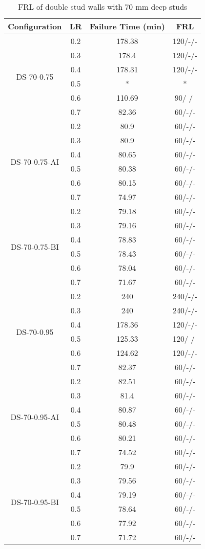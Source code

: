 \begin{table}[!htbp]
	\centering
	\caption{FRL of double stud walls with 70 mm deep studs}
	  \begin{tabular}{cccc}
	  \toprule
	  Configuration & LR    & Failure Time (min) & FRL \\
	  \midrule
	  \multirow{6}[2]{*}{DS-70-0.75} & 0.2   & 178.38 & 120/-/- \\
			& 0.3   & 178.4 & 120/-/- \\
			& 0.4   & 178.31 & 120/-/- \\
			& 0.5   & *     & * \\
			& 0.6   & 110.69 & 90/-/- \\
			& 0.7   & 82.36 & 60/-/- \\
	  \midrule
	  \multirow{6}[2]{*}{DS-70-0.75-AI} & 0.2   & 80.9  & 60/-/- \\
			& 0.3   & 80.9  & 60/-/- \\
			& 0.4   & 80.65 & 60/-/- \\
			& 0.5   & 80.38 & 60/-/- \\
			& 0.6   & 80.15 & 60/-/- \\
			& 0.7   & 74.97 & 60/-/- \\
	  \midrule
	  \multirow{6}[2]{*}{DS-70-0.75-BI} & 0.2   & 79.18 & 60/-/- \\
			& 0.3   & 79.16 & 60/-/- \\
			& 0.4   & 78.83 & 60/-/- \\
			& 0.5   & 78.43 & 60/-/- \\
			& 0.6   & 78.04 & 60/-/- \\
			& 0.7   & 71.67 & 60/-/- \\
	  \midrule
	  \multirow{6}[2]{*}{DS-70-0.95} & 0.2   & 240   & 240/-/- \\
			& 0.3   & 240   & 240/-/- \\
			& 0.4   & 178.36 & 120/-/- \\
			& 0.5   & 125.33 & 120/-/- \\
			& 0.6   & 124.62 & 120/-/- \\
			& 0.7   & 82.37 & 60/-/- \\
	  \midrule
	  \multirow{6}[2]{*}{DS-70-0.95-AI} & 0.2   & 82.51 & 60/-/- \\
			& 0.3   & 81.4  & 60/-/- \\
			& 0.4   & 80.87 & 60/-/- \\
			& 0.5   & 80.48 & 60/-/- \\
			& 0.6   & 80.21 & 60/-/- \\
			& 0.7   & 74.52 & 60/-/- \\
	  \midrule
	  \multirow{6}[2]{*}{DS-70-0.95-BI} & 0.2   & 79.9  & 60/-/- \\
			& 0.3   & 79.56 & 60/-/- \\
			& 0.4   & 79.19 & 60/-/- \\
			& 0.5   & 78.64 & 60/-/- \\
			& 0.6   & 77.92 & 60/-/- \\
			& 0.7   & 71.72 & 60/-/- \\
	  \bottomrule
	  \end{tabular}%
	\label{tab:frl-parametric-ds-70}%


\end{table}
